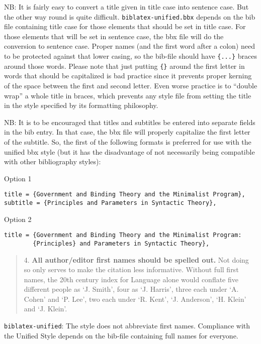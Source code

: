\documentclass[
]{article}
\begin{document}
NB: It is fairly easy to convert a title given in title case into
sentence case. But the other way round is quite difficult.
\texttt{biblatex-unified.bbx} depends on the bib file containing title
case for those elements that should be set in title case. For those
elements that will be set in sentence case, the bbx file will do the
conversion to sentence case. Proper names (and the first word after a
colon) need to be protected against that lower casing, so the bib-file
should have \texttt{\{...\}} braces around those words. Please note that
just putting \texttt{\{\}} around the first letter in words that should
be capitalized is bad practice since it prevents proper kerning of the
space between the first and second letter. Even worse practice is to
``double wrap'' a whole title in braces, which prevents any style file
from setting the title in the style specified by its formatting
philosophy.

NB: It is to be encouraged that titles and subtitles be entered into
separate fields in the bib entry. In that case, the bbx file will
properly capitalize the first letter of the subtitle. So, the first of
the following formats is preferred for use with the unified bbx style
(but it has the disadvantage of not necessarily being compatible with
other bibliography styles):

Option 1

\begin{verbatim}
title = {Government and Binding Theory and the Minimalist Program},
subtitle = {Principles and Parameters in Syntactic Theory},
\end{verbatim}

Option 2

\begin{verbatim}
title = {Government and Binding Theory and the Minimalist Program:  
        {Principles} and Parameters in Syntactic Theory},
\end{verbatim}

\begin{quote}
4. \textbf{All author/editor first names should be spelled out.} Not
doing so only serves to make the citation less informative. Without full
first names, the 20th century index for Language alone would conflate
five different people as `J. Smith', four as `J. Harris', three each
under `A. Cohen' and `P. Lee', two each under `R. Kent', `J. Anderson',
`H. Klein' and `J. Klein'.
\end{quote}

\texttt{biblatex-unified}: The style does not abbreviate first names.
Compliance with the Unified Style depends on the bib-file containing
full names for everyone.
\end{document}
